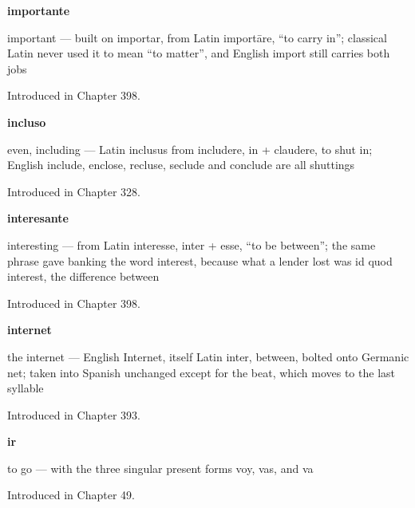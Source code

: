 \noindent\begin{minipage}[t]{\linewidth}
\raggedright
\textbf{importante}\par
\small important — built on importar, from Latin importāre, \textquotedblleft{}to carry in\textquotedblright{}; classical Latin never used it to mean \textquotedblleft{}to matter\textquotedblright{}, and English import still carries both jobs\par
\footnotesize Introduced in Chapter 398.
\end{minipage}\par\medskip

\noindent\begin{minipage}[t]{\linewidth}
\raggedright
\textbf{incluso}\par
\small even, including — Latin inclusus from includere, in + claudere, to shut in; English include, enclose, recluse, seclude and conclude are all shuttings\par
\footnotesize Introduced in Chapter 328.
\end{minipage}\par\medskip

\noindent\begin{minipage}[t]{\linewidth}
\raggedright
\textbf{interesante}\par
\small interesting — from Latin interesse, inter + esse, \textquotedblleft{}to be between\textquotedblright{}; the same phrase gave banking the word interest, because what a lender lost was id quod interest, the difference between\par
\footnotesize Introduced in Chapter 398.
\end{minipage}\par\medskip

\noindent\begin{minipage}[t]{\linewidth}
\raggedright
\textbf{internet}\par
\small the internet — English Internet, itself Latin inter, between, bolted onto Germanic net; taken into Spanish unchanged except for the beat, which moves to the last syllable\par
\footnotesize Introduced in Chapter 393.
\end{minipage}\par\medskip

\noindent\begin{minipage}[t]{\linewidth}
\raggedright
\textbf{ir}\par
\small to go — with the three singular present forms voy, vas, and va\par
\footnotesize Introduced in Chapter 49.
\end{minipage}\par\medskip

